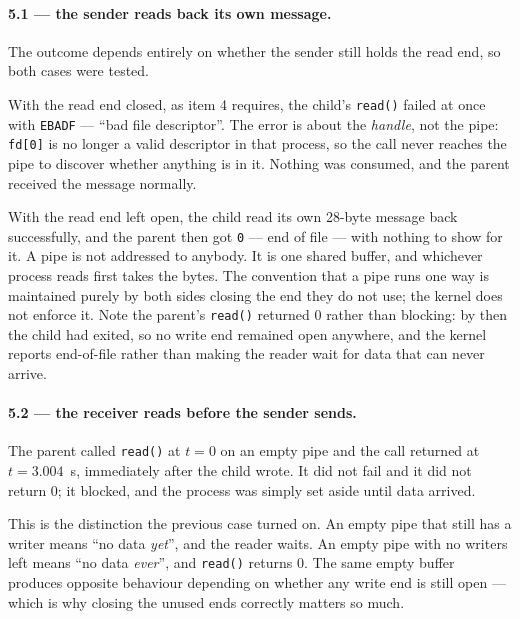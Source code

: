 
\paragraph{5.1 --- the sender reads back its own message.}
The outcome depends entirely on whether the sender still holds the read end, so
both cases were tested.

With the read end closed, as item 4 requires, the child's \texttt{read()} failed
at once with \texttt{EBADF} --- ``bad file descriptor''. The error is about the
\emph{handle}, not the pipe: \texttt{fd[0]} is no longer a valid descriptor in
that process, so the call never reaches the pipe to discover whether anything is
in it. Nothing was consumed, and the parent received the message normally.

With the read end left open, the child read its own 28-byte message back
successfully, and the parent then got \texttt{0} --- end of file --- with nothing
to show for it. A pipe is not addressed to anybody. It is one shared buffer, and
whichever process reads first takes the bytes. The convention that a pipe runs
one way is maintained purely by both sides closing the end they do not use; the
kernel does not enforce it. Note the parent's \texttt{read()} returned 0 rather
than blocking: by then the child had exited, so no write end remained open
anywhere, and the kernel reports end-of-file rather than making the reader wait
for data that can never arrive.

\paragraph{5.2 --- the receiver reads before the sender sends.}
The parent called \texttt{read()} at $t=0$ on an empty pipe and the call returned
at $t=3.004$~s, immediately after the child wrote. It did not fail and it did not
return 0; it blocked, and the process was simply set aside until data arrived.

This is the distinction the previous case turned on. An empty pipe that still has
a writer means ``no data \emph{yet}'', and the reader waits. An empty pipe with no
writers left means ``no data \emph{ever}'', and \texttt{read()} returns 0. The
same empty buffer produces opposite behaviour depending on whether any write end
is still open --- which is why closing the unused ends correctly matters so much.

